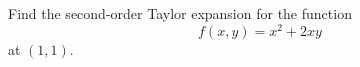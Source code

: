 \documentclass[openany]{book}
\begin{document}
\begin{prob}
    Find the second-order Taylor expansion for the function 
    \begin{equation*}
        f(x,y)=x^2+2xy
    \end{equation*}
    at $(1,1)$.
\end{prob}
\end{document}
